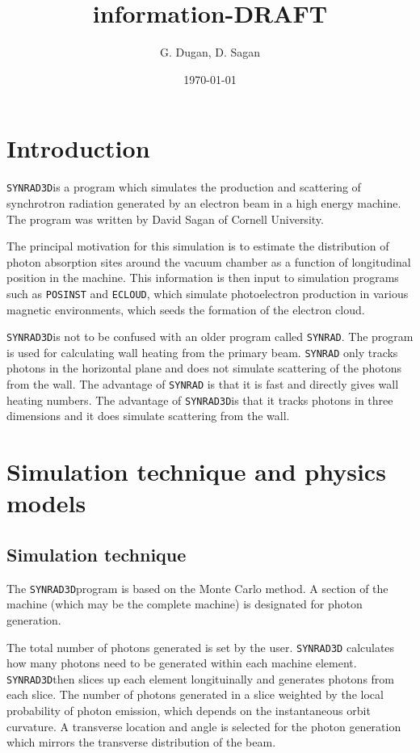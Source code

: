 \documentclass[11pt,landscape]{article}
\title{ \srthree information-DRAFT}
\author{G. Dugan, D. Sagan}
\date{\today}                                      %
\newcommand{\srthree}{\texttt{SYNRAD3D}}
\begin{document}
\maketitle

\section{Introduction} 

\srthree is a program which simulates
the production and scattering of synchrotron radiation generated by an
electron beam in a high energy machine. The program was written by David
Sagan of Cornell University.

The principal motivation for this simulation is to estimate the
distribution of photon absorption sites around the vacuum chamber as a
function of longitudinal position in the machine. This information is
then input to simulation programs such as \texttt{POSINST} and
\texttt{ECLOUD}, which simulate photoelectron production in various
magnetic environments, which seeds the formation of the electron
cloud.

\srthree is not to be confused with an older program called
\texttt{SYNRAD}. The  program is used for calculating
wall heating from the primary beam.  \texttt{SYNRAD} only tracks
photons in the horizontal plane and does not simulate scattering of
the photons from the wall. The advantage of \texttt{SYNRAD} is that it
is fast and directly gives wall heating numbers. The advantage of
\srthree is that it tracks photons in three dimensions and it does
simulate scattering from the wall.

\section{Simulation technique and physics models}
\subsection{Simulation technique} 

The \srthree program is based on the Monte
Carlo method. A section of the machine (which may be the complete machine)
is designated for photon generation.

The total number of photons generated is set by the user. \srthree
calculates how many photons need to be generated within each machine
element. \srthree then slices up each element longituinally and
generates photons from each slice. The number of photons generated in
a slice weighted by the local probability of photon emission, which
depends on the instantaneous orbit curvature. A transverse location
and angle is selected for the photon generation which mirrors the
transverse distribution of the beam.
\end{document}
